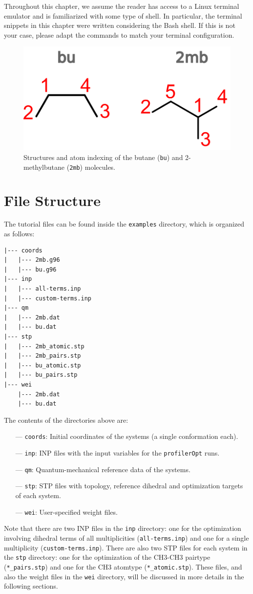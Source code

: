 \documentclass[10pt,a4paper,openany]{memoir}
\numberwithin{equation}{section}
\newcommand{\under}{\_}
\newcommand{\profileropt}[0]{\texttt{profilerOpt}}
\begin{document}
Throughout this chapter, we assume the reader has access to a Linux
terminal emulator and is familiarized with some type of shell.
%
In particular, the terminal snippets in this chapter were written
considering the Bash shell.
%
If this is not your case, please adapt the commands to match your
terminal configuration.

\begin{figure}[tb]
  \centering
  \includegraphics[width=.3\textwidth]{alkane-structures}
  \caption{Structures and atom indexing of the butane (\texttt{bu})
    and 2-methylbutane (\texttt{2mb}) molecules.}
  \label{fig:alkane-structures}
\end{figure}

\section{File Structure}
\label{sec:tutorial-file-structure}

The tutorial files can be found inside the \texttt{examples}
directory, which is organized as follows:

\begin{lstlisting}
|--- coords
|   |--- 2mb.g96
|   |--- bu.g96
|--- inp
|   |--- all-terms.inp
|   |--- custom-terms.inp
|--- qm
|   |--- 2mb.dat
|   |--- bu.dat
|--- stp
|   |--- 2mb_atomic.stp
|   |--- 2mb_pairs.stp
|   |--- bu_atomic.stp
|   |--- bu_pairs.stp
|--- wei
    |--- 2mb.dat
    |--- bu.dat
\end{lstlisting}
\vspace{1ex}\par

\noindent The contents of the directories above are:
\begin{itemize}
\item [---] \texttt{coords}: Initial coordinates of the systems (a single conformation each).
\item [---] \texttt{inp}: INP files with the input variables for the \profileropt{} runs. 
\item [---] \texttt{qm}: Quantum-mechanical reference data of the systems.
\item [---] \texttt{stp}: STP files with topology, reference dihedral and optimization targets of each system.
\item [---] \texttt{wei}: User-specified weight files.
\end{itemize}
%
Note that there are two INP files in the \texttt{inp} directory: one
for the optimization involving dihedral terms of all multiplicities
(\texttt{all-terms.inp}) and one for a single multiplicity
(\texttt{custom-terms.inp}).
%
There are also two STP files for each system in the \texttt{stp}
directory: one for the optimization of the CH3-CH3 pairtype
(\texttt{*\under{}pairs.stp}) and one for the CH3 atomtype
(\texttt{*\under{}atomic.stp}).
%
These files, and also the weight files in the \texttt{wei} directory,
will be discussed in more details in the following sections.
\end{document}
